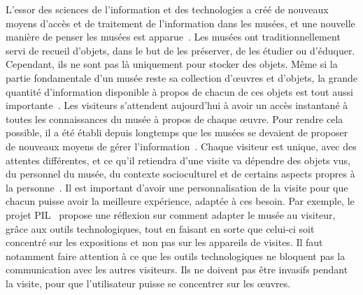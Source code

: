 L'essor des sciences de l'information et des technologies a créé de nouveaux moyens d'accès et de traitement de l'information dans les musées, et une nouvelle manière de penser les musées est apparue~\cite{marty2011my}. 
Les musées ont traditionnellement servi de recueil d'objets, dans le but de les préserver, de les étudier ou d'éduquer. 
Cependant, ils ne sont pas là uniquement pour stocker des objets.
Même si la partie fondamentale d'un musée reste sa collection d'œuvres et d'objets, la grande quantité d'information disponible à propos de chacun de ces objets est tout aussi importante~\cite{greenhill1992museums}.
Les visiteurs s'attendent aujourd'hui à avoir un accès instantané à toutes les connaissances du musée à propos de chaque œuvre. Pour rendre cela possible, il a été établi depuis longtemps que les musées se devaient de proposer de nouveaux moyens de gérer l'information~\cite{keene1996becoming}.
Chaque visiteur est unique, avec des attentes différentes, et ce qu’il retiendra d'une visite va dépendre des objets vus, du personnel du musée, du contexte socioculturel et de certains aspects propres à la personne~\cite{falk2016identity}.
Il est important d'avoir une personnalisation de la visite pour que chacun puisse avoir la meilleure expérience, adaptée à ces besoin.
Par exemple, le projet PIL~\cite{kuflik2011visitor} propose une réflexion sur comment adapter le musée au visiteur, grâce aux outils technologiques, tout en faisant en sorte que celui-ci soit concentré sur les expositions et non pas sur les appareils de visites.
Il faut notamment faire attention à ce que les outils technologiques ne bloquent pas la communication avec les autres visiteurs. Ils ne doivent pas être invasifs pendant la visite, pour que l'utilisateur puisse se concentrer sur les œuvres.
 
